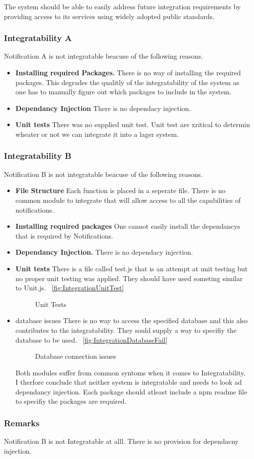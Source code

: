 The system should be able to easily address future integration requirements by providing access to its services using widely adopted public standards.
\subsubsection*{Integratability A}
Notification A is not integratable beacuse of the following reasons.
\begin{itemize}
	\item \textbf{Installing required Packages.}
	There is no way of installing the required packages. This degrades the qualitly of the integratability of the system as one has to manually figure out which packages to include in the system.
	\item \textbf{Dependancy Injection}
	There is no dependacy injection.
	\item \textbf{Unit tests}
	There was no supplied unit test. Unit test are xritical to determin wheater or not we can integrate it into a lager system.
\end{itemize}
\subsubsection*{Integratability B}
Notification B is not integratable beacuse of the following reasons.
\begin{itemize}
	\item \textbf{File Structure} 
	Each function is placed in a seperate file. There is no common module to integrate that will allow access to all the capabilities of notifications.
	\item \textbf{Installing required packages}
	One cannot easily install the dependancys that is required by Notifications.
	\item \textbf{Dependancy Injection.}
	There is no dependacy injection.
	\item \textbf{Unit tests} There is a file called test.js that is an attempt at unit testing but no proper unit testing was applied. They should have used someting similar to Unit.js.
		~\ref{fig:IntegrationUnitTest}
		\begin{figure}[H]
			\centering
			\caption{Unit Tests}
			\label{fig:scope}
		\end{figure}
	\item database issues
	There is no way to access the specified database and this also contributes to the integratability. They sould supply a way to specifiy the database to be used.
		~\ref{fig:IntegrationDatabaseFail}
		\begin{figure}[H]
			\centering
			\caption{Database connection issues}
			\label{fig:scope}
		\end{figure}
Both modules suffer from common syntoms when it comes to Integratability. I therfore conclude that neither system is integratable and needs to look ad dependancy injection. Each package should atleast include a npm readme file to specifiy the packages are required.
\end{itemize}
\subsubsection*{Remarks}
Notification B is not Integratable at alll. There is no provision for dependacny injection.